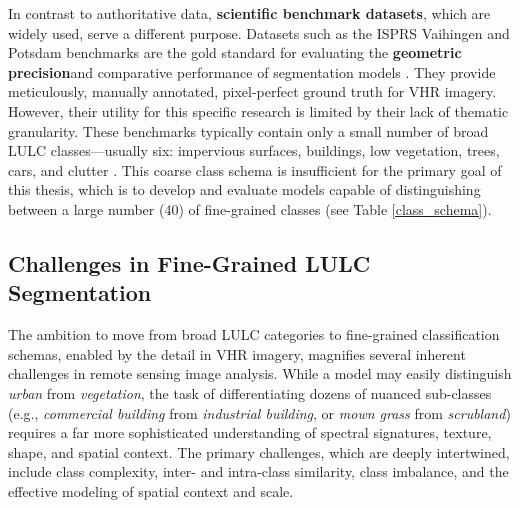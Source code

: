 \documentclass{report}
\begin{document}
In contrast to authoritative data, \textbf{scientific benchmark datasets}, which are widely used, serve a different purpose. Datasets such as the ISPRS Vaihingen and Potsdam benchmarks are the gold standard for evaluating the \textbf{geometric precision}and comparative performance of segmentation models \parencites[p.~8ff.]{NeupaneEtAlDeepLearningBasedSemanticSegmentationUrbanFeaturesSatelliteImagesReviewMetaAnalysis2021}. They provide meticulously, manually annotated, pixel-perfect ground truth for VHR imagery. However, their utility for this specific research is limited by their lack of thematic granularity. These benchmarks typically contain only a small number of broad LULC classes—usually six: impervious surfaces, buildings, low vegetation, trees, cars, and clutter \parencites[p.~2;]{SertelEtAlLandUseLandCoverMappingUsingDeepLearningBasedSegmentationApproachesVHRWorldview3Images2022}[p.~3157]{XuEtAlsemanticsegmentationmethodcategoryboundaryLandUseLandCoverLULCmappingVeryHighResolutionVHRremotesensingimage2021}. This coarse class schema is insufficient for the primary goal of this thesis, which is to develop and evaluate models capable of distinguishing between a large number (40) of fine-grained classes (see Table \ref{class_schema}).
\subsection{Challenges in Fine-Grained LULC Segmentation}
\label{sec:challenges_fine_grained_LULC}
The ambition to move from broad LULC categories to fine-grained classification schemas, enabled by the detail in VHR imagery, magnifies several inherent challenges in remote sensing image analysis. While a model may easily distinguish \textit{urban} from \textit{vegetation}, the task of differentiating dozens of nuanced sub-classes (e.g., \textit{commercial building} from \textit{industrial building}, or \textit{mown grass} from \textit{scrubland}) requires a far more sophisticated understanding of spectral signatures, texture, shape, and spatial context. The primary challenges, which are deeply intertwined, include class complexity, inter- and intra-class similarity, class imbalance, and the effective modeling of spatial context and scale.
\end{document}
